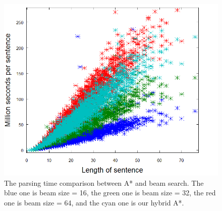 \begin{figure}
	\begin{center}
		\includegraphics[scale=0.35]{Figures/SpeedAndAccuracyComparison2.png}
		\caption{\label{devExFig2} The parsing time comparison between A* and beam search. The blue one is beam size = 16, the green one is beam size = 32, the red one is beam size = 64, and the cyan one is our hybrid A*.}
	\end{center}
\end{figure}